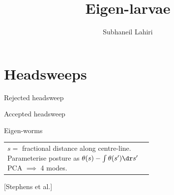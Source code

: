 \documentclass{beamer}
\title{Eigen-larvae}
\author{Subhaneil Lahiri}
\institute[Harvard]{%
Harvard University
}
\newcommand{\rref}[1]{\hfill \small{\color{darkgrey} [#1]}}
\begin{document}
%

%

\section{Headsweeps}


\begin{frame}{Rejected headsweep}
%
 \begin{center}
 \end{center}
%
\end{frame}

\begin{frame}{Accepted headsweep}
%
 \begin{center}
 \end{center}
%
\end{frame}


\begin{frame}{Eigen-worms}
%
\begin{tabular}{ll}
   \parbox{7.5cm}{}
   \parbox{4cm}{$s=$ fractional distance along centre-line.\\[0.5cm]
    Parameterise posture as $\theta(s)-\int\theta(s')\dr s'$\\[0.5cm]
    PCA $\implies$ 4 modes.}
 \end{tabular}

 \rref{Stephens et al.}
%
\end{frame}

\end{document}
